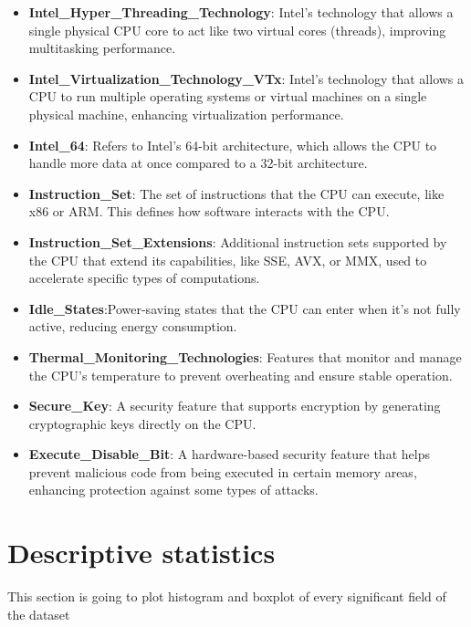 \documentclass{article}
\begin{document}
\begin{itemize}
		\item \textbf{Intel\_Hyper\_Threading\_Technology}:  Intel's technology that allows a single physical CPU core to act like two virtual cores (threads), improving multitasking performance.
		\item \textbf{Intel\_Virtualization\_Technology\_VTx}:  Intel’s technology that allows a CPU to run multiple operating systems or virtual machines on a single physical machine, enhancing virtualization performance.
		\item \textbf{Intel\_64}: Refers to Intel’s 64-bit architecture, which allows the CPU to handle more data at once compared to a 32-bit architecture.
		\item \textbf{Instruction\_Set}: The set of instructions that the CPU can execute, like x86 or ARM. This defines how software interacts with the CPU.
		\item \textbf{Instruction\_Set\_Extensions}: Additional instruction sets supported by the CPU that extend its capabilities, like SSE, AVX, or MMX, used to accelerate specific types of computations.
		\item \textbf{Idle\_States}:Power-saving states that the CPU can enter when it’s not fully active, reducing energy consumption.
		\item \textbf{Thermal\_Monitoring\_Technologies}: Features that monitor and manage the CPU’s temperature to prevent overheating and ensure stable operation.
		\item \textbf{Secure\_Key}: A security feature that supports encryption by generating cryptographic keys directly on the CPU.
		\item \textbf{Execute\_Disable\_Bit}: A hardware-based security feature that helps prevent malicious code from being executed in certain memory areas, enhancing protection against some types of attacks.
	\end{itemize}
	
	\section{Descriptive statistics}
	This section is going to plot histogram and boxplot of every significant field of the dataset
	
\end{document}
